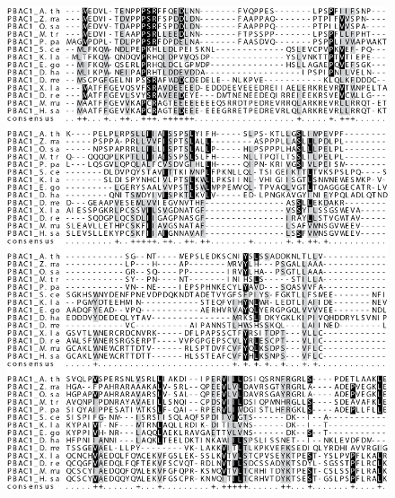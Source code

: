 \clearpage
\begin{figure}[ht]
	\centering
	\includegraphics[width=\columnwidth]{Proteasome/pbac1align1.png}
	{}
	\label{fig:pbac1align}
\end{figure}

